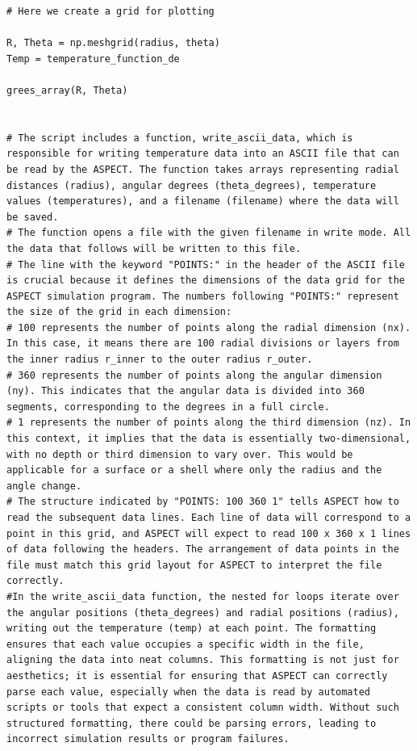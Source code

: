 \documentclass{article}
\begin{document}
\begin{verbatim}
# Here we create a grid for plotting

R, Theta = np.meshgrid(radius, theta)
Temp = temperature_function_de

grees_array(R, Theta)


# The script includes a function, write_ascii_data, which is responsible for writing temperature data into an ASCII file that can be read by the ASPECT. The function takes arrays representing radial distances (radius), angular degrees (theta_degrees), temperature values (temperatures), and a filename (filename) where the data will be saved.
# The function opens a file with the given filename in write mode. All the data that follows will be written to this file.
# The line with the keyword "POINTS:" in the header of the ASCII file is crucial because it defines the dimensions of the data grid for the ASPECT simulation program. The numbers following "POINTS:" represent the size of the grid in each dimension:
# 100 represents the number of points along the radial dimension (nx). In this case, it means there are 100 radial divisions or layers from the inner radius r_inner to the outer radius r_outer.
# 360 represents the number of points along the angular dimension (ny). This indicates that the angular data is divided into 360 segments, corresponding to the degrees in a full circle.
# 1 represents the number of points along the third dimension (nz). In this context, it implies that the data is essentially two-dimensional, with no depth or third dimension to vary over. This would be applicable for a surface or a shell where only the radius and the angle change.
# The structure indicated by "POINTS: 100 360 1" tells ASPECT how to read the subsequent data lines. Each line of data will correspond to a point in this grid, and ASPECT will expect to read 100 x 360 x 1 lines of data following the headers. The arrangement of data points in the file must match this grid layout for ASPECT to interpret the file correctly.
#In the write_ascii_data function, the nested for loops iterate over the angular positions (theta_degrees) and radial positions (radius), writing out the temperature (temp) at each point. The formatting ensures that each value occupies a specific width in the file, aligning the data into neat columns. This formatting is not just for aesthetics; it is essential for ensuring that ASPECT can correctly parse each value, especially when the data is read by automated scripts or tools that expect a consistent column width. Without such structured formatting, there could be parsing errors, leading to incorrect simulation results or program failures.

\end{verbatim}
\end{document}
